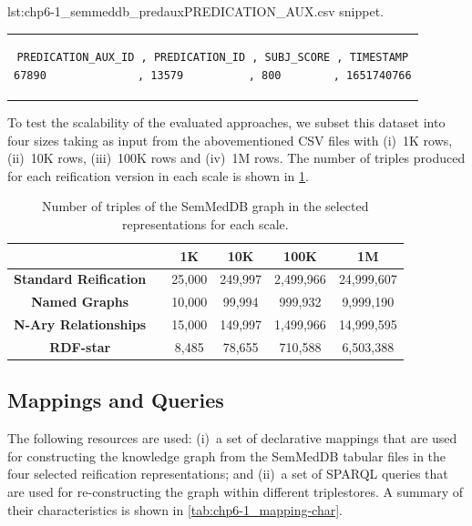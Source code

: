 \noindent\hspace{0.23\linewidth}\begin{minipage}{\linewidth}
\begin{captionedlisting}{lst:chp6-1_semmeddb_predaux}{PREDICATION\_AUX.csv snippet.}
\centering
\begin{tabular}{c}
\hspace{-7em}
{
\begin{lstlisting}[basicstyle=\ttfamily\small,label={lst:chp6-1_semmeddb_predaux},columns=flexible]
PREDICATION_AUX_ID , PREDICATION_ID , SUBJ_SCORE , TIMESTAMP
67890              , 13579          , 800        , 1651740766
\end{lstlisting}
}
\end{tabular}
\end{captionedlisting}
\end{minipage}


To test the scalability of the evaluated approaches, we subset this dataset into four sizes taking as input from the abovementioned CSV files with (i)~1K rows, (ii)~10K rows, (iii)~100K rows and (iv)~1M rows. The number of triples produced for each reification version in each scale is shown in \cref{tab:chp6-1_data-triple-number}.

\begin{table}[t]
\caption[SemMedDB scale sizes]{Number of triples of the SemMedDB graph in the selected representations for each scale.}
\label{tab:chp6-1_data-triple-number}
\centering
\begin{tabular}{cccccc}
    \cmidrule{2-6}
    & & \textbf{1K} & \textbf{10K} & \textbf{100K} & \textbf{1M} \\ \midrule
    \textbf{Standard Reification} & & 25,000 & 249,997 & 2,499,966 & 24,999,607 \\ \midrule
    \textbf{Named Graphs} & & 10,000 & 99,994 & 999,932 & 9,999,190 \\ \midrule
    \textbf{N-Ary Relationships} & & 15,000 & 149,997 & 1,499,966 & 14,999,595 \\ \midrule
    \textbf{RDF-star} & & 8,485 & 78,655 & 710,588 & 6,503,388 \\ \bottomrule
\end{tabular}
\end{table}




\subsection{Mappings and Queries}
\label{sec:chp6-1_map-queries}
The following resources are used: 
(i)~a set of declarative mappings that are used for constructing the knowledge graph from the SemMedDB tabular files in the four selected reification representations; and (ii)~a set of SPARQL queries that are used for re-constructing the graph within different triplestores. A summary of their characteristics is shown in \cref{tab:chp6-1_mapping-char}.


